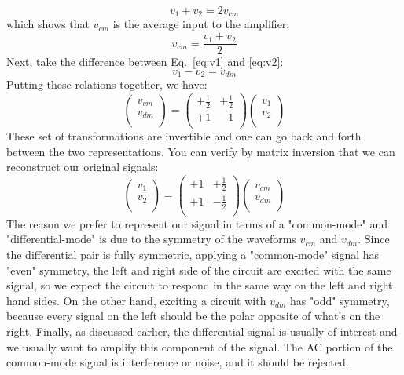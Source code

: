     \begin{equation}
        v_1 + v_2 = 2 v_{cm}
    \end{equation}
which shows that $v_{cm}$ is the average input to the amplifier:
    \begin{equation}
        v_{cm} = \frac{v_1 + v_2}{2}
    \end{equation}
Next, take the difference between Eq.~\ref{eq:v1} and \ref{eq:v2}:
    \begin{equation}
        v_1 - v_2 = v_{dm} 
    \end{equation}
Putting these relations together, we have:
    \begin{equation}
    	\begin{pmatrix}
    		v_{cm}\\
    		v_{dm}\\
    	\end{pmatrix} =
    	\begin{pmatrix}
    		+\frac{1}{2} & +\frac{1}{2}\\
    		+1 & -1\\
    	\end{pmatrix} 
    	\begin{pmatrix}
    		v_{1}\\
    		v_{2}\\
    	\end{pmatrix} 
    \end{equation}  
These set of transformations are invertible and one can go back and forth between the two representations.  You can verify by matrix inversion that we can reconstruct our original signals:
    \begin{equation}
    	\begin{pmatrix}
    		v_{1}\\
    		v_{2}\\
    	\end{pmatrix} =
    	\begin{pmatrix}
    		+1 & +\frac{1}{2}\\
    		+1 & -\frac{1}{2}\\
    	\end{pmatrix} 
    	\begin{pmatrix}
    		v_{cm}\\
    		v_{dm}\\
    	\end{pmatrix} 
    \end{equation}  
The reason we prefer to represent our signal in terms of a "common-mode" and "differential-mode" is due to the symmetry of the waveforms $v_{cm}$ and $v_{dm}$.  Since the differential pair is fully symmetric, applying a "common-mode" signal has "even" symmetry, the left and right side of the circuit are excited with the same signal, so we expect the circuit to respond in the same way on the left and right hand sides.  On the other hand, exciting a circuit with $v_{dm}$ has "odd" symmetry, because every signal on the left should be the polar opposite of what's on the right.	Finally, as discussed earlier, the differential signal is usually of interest and we usually want to amplify this component of the signal. The AC portion of the common-mode signal is interference or noise, and it should be rejected.  
